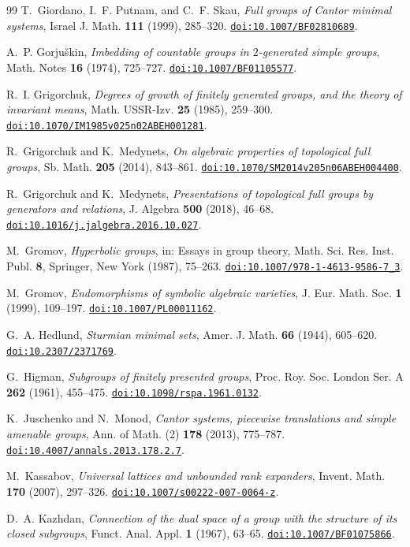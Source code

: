 \documentclass[11pt]{amsart}
\newcommand{\doi}[1]{\href{https://doi.org/#1}{\nolinkurl{doi:#1}}}
\begin{document}
\begin{thebibliography}{99}
T.~Giordano, I.~F. Putnam, and C.~F. Skau,
\emph{Full groups of Cantor minimal systems},
Israel J. Math. \textbf{111} (1999), 285--320.
\doi{10.1007/BF02810689}.

A.~P. Gorju\v{s}kin, \emph{Imbedding of countable groups in
$2$-generated simple groups}, Math. Notes \textbf{16} (1974), 725--727.
\doi{10.1007/BF01105577}.

R.~I. Grigorchuk, \emph{Degrees of growth of finitely generated groups,
and the theory of invariant means}, Math. USSR-Izv. \textbf{25} (1985),
259--300. \doi{10.1070/IM1985v025n02ABEH001281}.

R.~Grigorchuk and K.~Medynets,
\emph{On algebraic properties of topological full groups},
Sb. Math. \textbf{205} (2014), 843--861.
\doi{10.1070/SM2014v205n06ABEH004400}.

R.~Grigorchuk and K.~Medynets,
\emph{Presentations of topological full groups by generators and
relations}, J. Algebra \textbf{500} (2018), 46--68.
\doi{10.1016/j.jalgebra.2016.10.027}.

M.~Gromov, \emph{Hyperbolic groups}, in: Essays in group theory, Math.
Sci. Res. Inst. Publ. \textbf{8}, Springer, New York (1987), 75--263.
\doi{10.1007/978-1-4613-9586-7_3}.

M.~Gromov, \emph{Endomorphisms of symbolic algebraic varieties},
J. Eur. Math. Soc. \textbf{1} (1999), 109--197.
\doi{10.1007/PL00011162}.

G.~A. Hedlund, \emph{Sturmian minimal sets},
Amer. J. Math. \textbf{66} (1944), 605--620.
\doi{10.2307/2371769}.

G.~Higman, \emph{Subgroups of finitely presented groups},
Proc. Roy. Soc. London Ser. A \textbf{262} (1961), 455--475.
\doi{10.1098/rspa.1961.0132}.

K.~Juschenko and N.~Monod,
\emph{Cantor systems, piecewise translations and simple amenable groups},
Ann. of Math. (2) \textbf{178} (2013), 775--787.
\doi{10.4007/annals.2013.178.2.7}.

M.~Kassabov, \emph{Universal lattices and unbounded rank expanders},
Invent. Math. \textbf{170} (2007), 297--326.
\doi{10.1007/s00222-007-0064-z}.

D.~A. Kazhdan, \emph{Connection of the dual space of a group with the
structure of its closed subgroups}, Funct. Anal. Appl. \textbf{1} (1967),
63--65. \doi{10.1007/BF01075866}.


\end{thebibliography}
\end{document}
